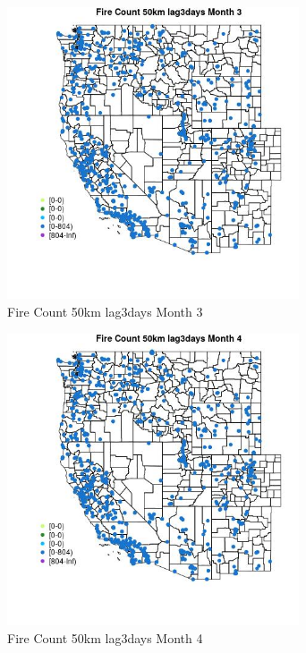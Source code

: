 \begin{figure} 
\centering  
\includegraphics[width=0.77\textwidth]{Code_Outputs/Report_ML_input_PM25_Step4_part_f_de_duplicated_aveswNAs_MapObsMo3Fire_Count_50km_lag3days.jpg} 
\caption{\label{fig:Report_ML_input_PM25_Step4_part_f_de_duplicated_aveswNAsMapObsMo3Fire_Count_50km_lag3days}Fire Count 50km lag3days Month 3} 
\end{figure} 
 

\begin{figure} 
\centering  
\includegraphics[width=0.77\textwidth]{Code_Outputs/Report_ML_input_PM25_Step4_part_f_de_duplicated_aveswNAs_MapObsMo4Fire_Count_50km_lag3days.jpg} 
\caption{\label{fig:Report_ML_input_PM25_Step4_part_f_de_duplicated_aveswNAsMapObsMo4Fire_Count_50km_lag3days}Fire Count 50km lag3days Month 4} 
\end{figure} 
 

